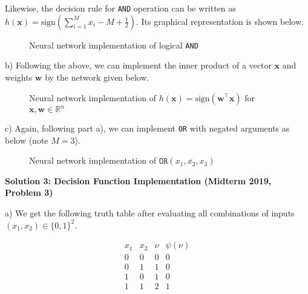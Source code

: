 \documentclass{article}
\newcommand{\R}{\mathbb{R}}
\renewcommand{\vec}[1]{\mathbf{#1}}
\begin{document}
    Likewise, the decision rule for \texttt{AND} operation can be written as
    $h(\vec{x}) = \text{sign}\left(\sum_{i=1}^M x_i - M + \frac{1}{2}\right)$.
    Its graphical representation is shown below.
    \begin{figure}[!h]
        \caption{Neural network implementation of logical \texttt{AND}}
    \end{figure}
    
    \pagebreak

    b) Following the above, we can implement the inner product of a vector 
    $\vec{x}$ and weights $\vec{w}$ by the network given below.
    \begin{figure}[!ht]
        \caption{Neural network implementation of $h(\vec{x}) = \text{sign}
        (\vec{w}^\top\vec{x})$ for $\vec{x}, \vec{w} \in \R^n$}
    \end{figure}
    
    c) Again, following part a), we can implement \texttt{OR} with negated 
    arguments as below (note $M=3$). 
    \begin{figure}[!ht]
        \caption{Neural network implementation of $\texttt{OR}(x_1,\overline
        {x_2},x_3)$}
    \end{figure}


    \vspace{0.5cm}

    \textbf{Solution 3: Decision Function Implementation (Midterm 2019, 
    Problem 3)}

    a) We get the following truth table after evaluating all combinations of
    inputs $(x_1, x_2) \in \{0,1\}^2$.
    
    \begin{table}[h]
        \[
            \begin{array}{cccc}
                x_1 & x_2 & \nu & \psi(\nu) \\ \hline
                0 & 0 & 0 & 0 \\
                0 & 1 & 1 & 0 \\
                1 & 0 & 1 & 0 \\
                1 & 1 & 2 & 1
            \end{array}
        \]
    \end{table}
\end{document}
